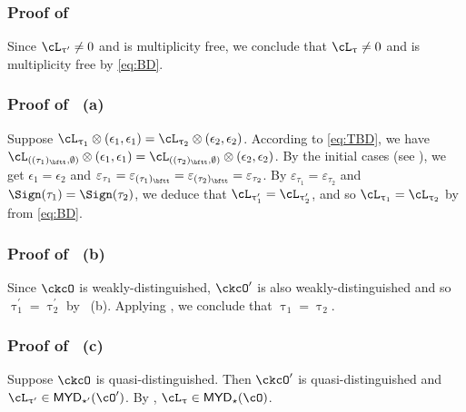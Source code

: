 \documentclass[12pt,a4paper]{amsart}
\def\MYD{{\mathsf{MYD}}}
\numberwithin{equation}{section}
\theoremstyle{remark}
\def\uptaup{\uptau^{\prime}}
\begin{document}
\subsubsection*{Proof of }

Since $\ac_{\uptau'}\neq 0$ and is multiplicity free, we conclude that $\ac_{\uptau}\neq 0$ and
is multiplicity free by \eqref{eq:BD}.


\subsubsection*{Proof of ~(a)}
Suppose $\ac_{\uptau_1}\lotimes (\epsilon_{1},\epsilon_{1})
= \ac_{\uptau_2}\lotimes( \epsilon_{2},\epsilon_{2} )$.
According to \eqref{eq:TBD}, we have
$\cL_{((\tau_{1})_{\bftt},\emptyset)}\lotimes(\epsilon_{1},\epsilon_{1}) =
\cL_{((\tau_{2})_{\bftt},\emptyset)}\lotimes(\epsilon_{2},\epsilon_{2})$.
By the initial cases (see ), we get $\epsilon_{1}=\epsilon_{2}$ and
$\varepsilon_{\tau_{1}}=\varepsilon_{(\tau_{1})_{\bftt}}=\varepsilon_{(\tau_{2})_{\bftt}}=\varepsilon_{\tau_{2}}$.
By $\varepsilon_{\tau_1} = \varepsilon_{\tau_2}$ and
$\Sign(\tau_1)=\Sign(\tau_2)$, we deduce that
$\ac_{\uptaup_{1}}=\ac_{\uptaup_{2}}$, and so $\ac_{\uptau_1}= \ac_{\uptau_2}$ by from  \eqref{eq:BD}. 

\subsubsection*{Proof of ~(b)}

Since $\ckcO$ is
weakly-distinguished, $\ckcO'$ is also weakly-distinguished and so
$\uptaup_{1}=\uptaup_{2}$ by ~(b). Applying , we
conclude that $\uptau_{1}=\uptau_{2}$.

\subsubsection*{Proof of ~(c)}

Suppose $\ckcO$ is quasi-distinguished.
Then $\ckcO'$ is quasi-distinguished and $\ac_{\uptau'}\in \MYD_{\star'}(\cO')$.
By , $\ac_{\uptau}\in \MYD_{\star}(\cO)$.

\end{document}
